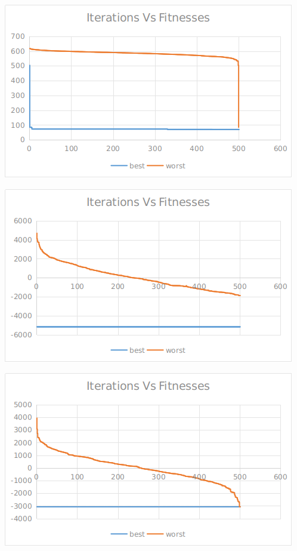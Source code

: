 \documentclass[12pt]{article}
\begin{document}
					\begin{minipage}{0.6\linewidth}
						\includegraphics[width=\linewidth]{45.png}
					\end{minipage}
					\hfill
					\begin{minipage}{0.6\linewidth}
						\includegraphics[width=\linewidth]{46.png}
					\end{minipage}
					\begin{minipage}{0.6\linewidth}
						\includegraphics[width=\linewidth]{47.png}
					\end{minipage}
\end{document}
